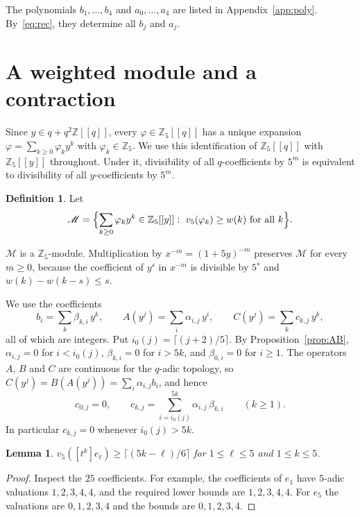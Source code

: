 \documentclass[11pt]{article}
\newtheorem{lemma}[theorem]{Lemma}
\theoremstyle{definition}
\newtheorem{definition}[theorem]{Definition}
\theoremstyle{remark}
\numberwithin{equation}{section}
\newcommand{\Mod}{\mathscr{M}}
\newcommand{\Z}{\mathbb{Z}}
\begin{document}
The polynomials $b_1,\dots,b_4$ and $a_0,\dots,a_4$ are listed in Appendix~\ref{app:poly}. By~\eqref{eq:rec}, they determine all $b_j$ and $a_j$.

\section{A weighted module and a contraction}\label{sec:contraction}

Since $y\in q+q^2\Z[[q]]$, every $\varphi\in\Z_5[[q]]$ has a unique expansion $\varphi=\sum_{k\ge0}\varphi_ky^k$ with $\varphi_k\in\Z_5$. We use this identification of $\Z_5[[q]]$ with $\Z_5[[y]]$ throughout. Under it, divisibility of all $q$-coefficients by $5^m$ is equivalent to divisibility of all $y$-coefficients by $5^m$.

\begin{definition}
Let
\[
\Mod=\Bigl\{\sum_{k\ge0}\varphi_ky^k\in\Z_5[[y]]:\ v_5(\varphi_k)\ge w(k)\text{ for all }k\Bigr\}.
\]
\end{definition}

$\Mod$ is a $\Z_5$-module. Multiplication by $x^{-m}=(1+5y)^{-m}$ preserves $\Mod$ for every $m\ge0$, because the coefficient of $y^s$ in $x^{-m}$ is divisible by $5^s$ and $w(k)-w(k-s)\le s$.

We use the coefficients
\[
b_i=\sum_k\beta_{k,i}\,y^k,\qquad A(y^j)=\sum_i\alpha_{i,j}\,y^i,\qquad C(y^j)=\sum_kc_{k,j}\,y^k,
\]
all of which are integers. Put $i_0(j)=\lceil(j+2)/5\rceil$. By Proposition~\ref{prop:AB}, $\alpha_{i,j}=0$ for $i<i_0(j)$, $\beta_{k,i}=0$ for $i>5k$, and $\beta_{0,i}=0$ for $i\ge1$. The operators $A$, $B$ and $C$ are continuous for the $q$-adic topology, so $C(y^j)=B(A(y^j))=\sum_i\alpha_{i,j}b_i$, and hence
\begin{equation}\label{eq:ckj}
c_{0,j}=0,\qquad c_{k,j}=\sum_{i=i_0(j)}^{5k}\alpha_{i,j}\,\beta_{k,i}\qquad(k\ge1).
\end{equation}
In particular $c_{k,j}=0$ whenever $i_0(j)>5k$.

\begin{lemma}\label{lem:e}
$v_5([t^k]e_\ell)\ge\lceil(5k-\ell)/6\rceil$ for $1\le\ell\le5$ and $1\le k\le5$.
\end{lemma}

\begin{proof}
Inspect the $25$ coefficients. For example, the coefficients of $e_1$ have $5$-adic valuations $1,2,3,4,4$, and the required lower bounds are $1,2,3,4,4$. For $e_5$ the valuations are $0,1,2,3,4$ and the bounds are $0,1,2,3,4$.
\end{proof}
\end{document}

